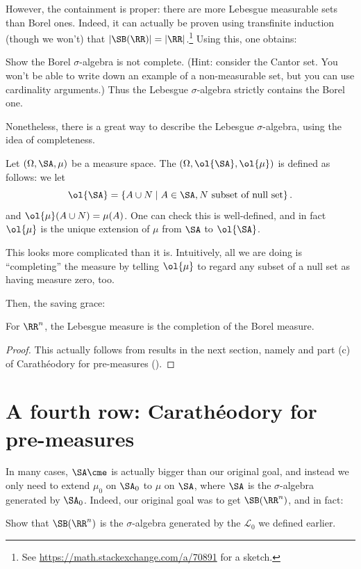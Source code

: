 However, the containment is proper:
there are more Lebesgue measurable sets than Borel ones.
Indeed, it can actually be proven using transfinite induction
(though we won't) that
$\left\lvert \SB(\RR) \right\rvert = \left\lvert \RR \right\rvert$.\footnote{See
	\url{https://math.stackexchange.com/a/70891} for a sketch.}
Using this, one obtains:
\begin{exercise}
	Show the Borel $\sigma$-algebra is not complete.
	(Hint: consider the Cantor set.
	You won't be able to write down an example of a non-measurable
	set, but you can use cardinality arguments.)
	Thus the Lebesgue $\sigma$-algebra strictly contains the Borel one.
\end{exercise}

Nonetheless, there is a great way to describe the Lebesgue $\sigma$-algebra,
using the idea of completeness.
\begin{definition}
	Let $(\Omega, \SA, \mu)$ be a measure space.
	The  $(\Omega, \ol{\SA}, \ol{\mu})$
	is defined as follows:
	we let
	\[ \ol{\SA} = \left\{ A \cup N \mid A \in \SA,
		N \text{ subset of null set} \right\}. \]
	and $\ol{\mu}(A \cup N) = \mu(A)$.
	One can check this is well-defined,
	and in fact $\ol{\mu}$ is the unique extension
	of $\mu$ from $\SA$ to $\ol{\SA}$.

	This looks more complicated than it is.
	Intuitively, all we are doing is ``completing'' the measure
	by telling $\ol{\mu}$ to regard any subset of a null set
	as having measure zero, too.
\end{definition}

Then, the saving grace:
\begin{theorem}
	For $\RR^n$, the Lebesgue measure is the completion of the Borel measure.
\end{theorem}
\begin{proof}
	This actually follows from results in the next section,
	namely 
	and part (c) of Carath\'{e}odory for pre-measures ().
\end{proof}

\section{A fourth row: Carath\'{e}odory for pre-measures}
In many cases, $\SA\cme$ is actually bigger than our original goal,
and instead we only need to extend $\mu_0$ on $\SA_0$
to $\mu$ on $\SA$, where $\SA$ is the $\sigma$-algebra generated by $\SA_0$.
Indeed, our original goal was to get $\SB(\RR^n)$, and in fact:
\begin{exercise}
	\label{exer:cubes_vs_open}
	Show that $\SB(\RR^n)$ is the $\sigma$-algebra generated
	by the $\mathcal{L}_0$ we defined earlier.
\end{exercise}

